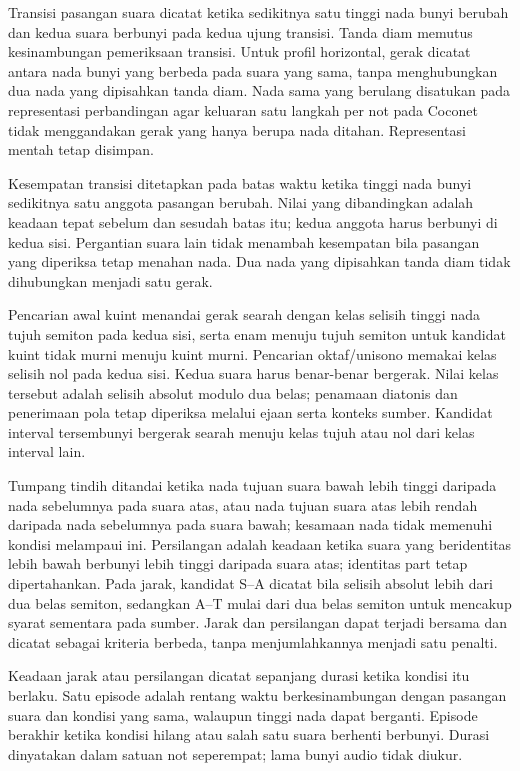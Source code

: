 Transisi pasangan suara dicatat ketika sedikitnya satu tinggi nada bunyi berubah dan kedua suara berbunyi pada kedua ujung transisi. Tanda diam memutus kesinambungan pemeriksaan transisi. Untuk profil horizontal, gerak dicatat antara nada bunyi yang berbeda pada suara yang sama, tanpa menghubungkan dua nada yang dipisahkan tanda diam. Nada sama yang berulang disatukan pada representasi perbandingan agar keluaran satu langkah per not pada Coconet tidak menggandakan gerak yang hanya berupa nada ditahan. Representasi mentah tetap disimpan.

Kesempatan transisi ditetapkan pada batas waktu ketika tinggi nada bunyi sedikitnya satu anggota pasangan berubah. Nilai yang dibandingkan adalah keadaan tepat sebelum dan sesudah batas itu; kedua anggota harus berbunyi di kedua sisi. Pergantian suara lain tidak menambah kesempatan bila pasangan yang diperiksa tetap menahan nada. Dua nada yang dipisahkan tanda diam tidak dihubungkan menjadi satu gerak.

Pencarian awal kuint menandai gerak searah dengan kelas selisih tinggi nada tujuh semiton pada kedua sisi, serta enam menuju tujuh semiton untuk kandidat kuint tidak murni menuju kuint murni. Pencarian oktaf/unisono memakai kelas selisih nol pada kedua sisi. Kedua suara harus benar-benar bergerak. Nilai kelas tersebut adalah selisih absolut modulo dua belas; penamaan diatonis dan penerimaan pola tetap diperiksa melalui ejaan serta konteks sumber. Kandidat interval tersembunyi bergerak searah menuju kelas tujuh atau nol dari kelas interval lain.

Tumpang tindih ditandai ketika nada tujuan suara bawah lebih tinggi daripada nada sebelumnya pada suara atas, atau nada tujuan suara atas lebih rendah daripada nada sebelumnya pada suara bawah; kesamaan nada tidak memenuhi kondisi melampaui ini. Persilangan adalah keadaan ketika suara yang beridentitas lebih bawah berbunyi lebih tinggi daripada suara atas; identitas part tetap dipertahankan. Pada jarak, kandidat S--A dicatat bila selisih absolut lebih dari dua belas semiton, sedangkan A--T mulai dari dua belas semiton untuk mencakup syarat sementara pada sumber. Jarak dan persilangan dapat terjadi bersama dan dicatat sebagai kriteria berbeda, tanpa menjumlahkannya menjadi satu penalti.

Keadaan jarak atau persilangan dicatat sepanjang durasi ketika kondisi itu berlaku. Satu episode adalah rentang waktu berkesinambungan dengan pasangan suara dan kondisi yang sama, walaupun tinggi nada dapat berganti. Episode berakhir ketika kondisi hilang atau salah satu suara berhenti berbunyi. Durasi dinyatakan dalam satuan not seperempat; lama bunyi audio tidak diukur.

